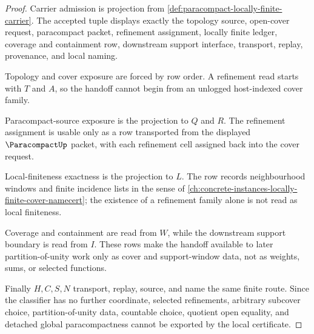 \begin{proof}
Carrier admission is projection from \autoref{def:paracompact-locally-finite-carrier}. The accepted tuple displays exactly the topology source, open-cover request, paracompact packet, refinement assignment, locally finite ledger, coverage and containment row, downstream support interface, transport, replay, provenance, and local naming.

Topology and cover exposure are forced by row order. A refinement read starts with $T$ and $A$, so the handoff cannot begin from an unlogged host-indexed cover family.

Paracompact-source exposure is the projection to $Q$ and $R$. The refinement assignment is usable only as a row transported from the displayed $\ParacompactUp$ packet, with each refinement cell assigned back into the cover request.

Local-finiteness exactness is the projection to $L$. The row records neighbourhood windows and finite incidence lists in the sense of \autoref{ch:concrete-instances-locally-finite-cover-namecert}; the existence of a refinement family alone is not read as local finiteness.

Coverage and containment are read from $W$, while the downstream support boundary is read from $I$. These rows make the handoff available to later partition-of-unity work only as cover and support-window data, not as weights, sums, or selected functions.

Finally $H,C,S,N$ transport, replay, source, and name the same finite route. Since the classifier has no further coordinate, selected refinements, arbitrary subcover choice, partition-of-unity data, countable choice, quotient open equality, and detached global paracompactness cannot be exported by the local certificate.
\end{proof}

